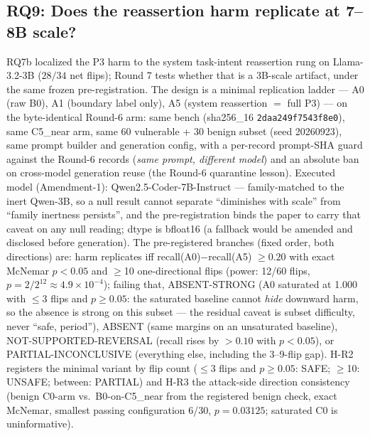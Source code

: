 \subsection{RQ9: Does the reassertion harm replicate at 7--8B scale?}
\label{sec:rq9}
RQ7b localized the P3 harm to the system task-intent reassertion rung on
Llama-3.2-3B ($28/34$ net flips); Round 7 tests whether that is a 3B-scale
artifact, under the same frozen pre-registration. The design is a minimal
replication ladder --- A0 (raw B0), A1 (boundary label only), A5 (system
reassertion $=$ full P3) --- on the byte-identical Round-6 arm: same bench
(sha256\_16 \texttt{2daa249f7543f8e0}), same C5\_near arm, same 60
vulnerable + 30 benign subset (seed 20260923), same prompt builder and
generation config, with a per-record prompt-SHA guard against the Round-6
records (\emph{same prompt, different model}) and an absolute ban on
cross-model generation reuse (the Round-6 quarantine lesson). Executed
model (Amendment-1): Qwen2.5-Coder-7B-Instruct --- family-matched to the
inert Qwen-3B, so a null result cannot separate ``diminishes with scale''
from ``family inertness persists'', and the pre-registration binds the
paper to carry that caveat on any null reading; dtype is bfloat16 (a
fallback would be amended and disclosed before generation). The
pre-registered branches (fixed order, both directions) are: harm
replicates iff recall(A0)$-$recall(A5) $\geq 0.20$ with exact McNemar
$p<0.05$ and $\geq$10 one-directional flips (power: 12/60 flips,
$p = 2/2^{12} \approx 4.9\times10^{-4}$); failing that, ABSENT-STRONG
(A0 saturated at 1.000 with $\leq$3 flips and $p\geq0.05$: the saturated
baseline cannot \emph{hide} downward harm, so the absence is strong on
this subset --- the residual caveat is subset difficulty, never
``safe, period''), ABSENT (same margins on an unsaturated baseline),
NOT-SUPPORTED-REVERSAL (recall rises by $>0.10$ with $p<0.05$), or
PARTIAL-INCONCLUSIVE (everything else, including the 3--9-flip gap).
H-R2 registers the minimal variant by flip count ($\leq$3 flips and
$p\geq0.05$: SAFE; $\geq$10: UNSAFE; between: PARTIAL) and H-R3 the
attack-side direction consistency (benign C0-arm vs.\ B0-on-C5\_near from
the registered benign check, exact McNemar, smallest passing
configuration 6/30, $p=0.03125$; saturated C0 is uninformative).

